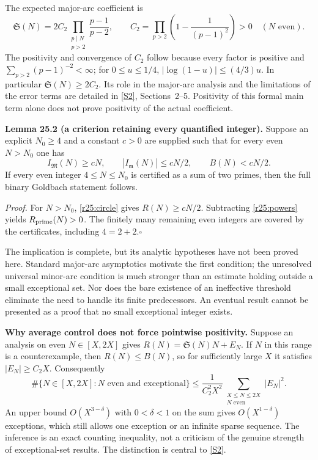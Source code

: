 \documentclass[11pt,a4paper]{article}
\newcommand{\N}{\mathbb{N}}
\newcommand{\sref}[2]{\hyperlink{source:#1:#2}{[S#2]}}
\numberwithin{equation}{section}
\begin{document}
The expected major-arc coefficient is
\begin{equation}\label{r25:singular}
 \mathfrak S(N)=2C_2\prod_{\substack{p\mid N\\p>2}}\frac{p-1}{p-2},
 \qquad C_2=\prod_{p>2}\left(1-\frac1{(p-1)^2}\right)>0
 \quad(N\text{ even}).
\end{equation}
The positivity and convergence of $C_2$ follow because every factor is
positive and $\sum_{p>2}(p-1)^{-2}<\infty$; for $0\le u\le1/4$,
$|\log(1-u)|\le(4/3)u$. In particular $\mathfrak S(N)\ge2C_2$.
Its role in the major-arc analysis and the limitations of the error terms
are detailed in \sref{25}{2}, Sections~2--5. Positivity of this formal
main term alone does not prove positivity of the actual coefficient.

\textbf{Lemma 25.2 (a criterion retaining every quantified integer).}
Suppose an explicit $N_0\ge4$ and a constant $c>0$ are supplied such that
for every even $N>N_0$ one has
\begin{equation}\label{r25:missing}
 I_{\mathfrak M}(N)\ge cN,\qquad
 |I_{\mathfrak m}(N)|\le cN/2,\qquad B(N)<cN/2.
\end{equation}
If every even integer $4\le N\le N_0$ is certified as a sum of two
primes, then the full binary Goldbach statement follows.

\emph{Proof.} For $N>N_0$, \eqref{r25:circle} gives $R(N)\ge cN/2$.
Subtracting \eqref{r25:powers} yields $R_{\rm prime}(N)>0$. The finitely
many remaining even integers are covered by the certificates, including
$4=2+2$.\hfill$\square$

The implication is complete, but its analytic hypotheses have not been
proved here. Standard major-arc asymptotics motivate the first condition;
the unresolved universal minor-arc condition is much stronger than an
estimate holding outside a small exceptional set. Nor does the bare
existence of an ineffective threshold eliminate the need to handle its
finite predecessors. An eventual result cannot be presented as a proof
that no small exceptional integer exists.

\medskip
\textbf{Why average control does not force pointwise positivity.}
Suppose an analysis on even $N\in[X,2X]$ gives
$R(N)=\mathfrak S(N)N+E_N$. If $N$ in this range is a counterexample,
then $R(N)\le B(N)$, so for sufficiently large $X$ it satisfies
$|E_N|\ge C_2X$. Consequently
\begin{equation}\label{r25:exceptional}
 \#\{N\in[X,2X]:N\text{ even and exceptional}\}
 \le\frac1{C_2^2X^2}\sum_{\substack{X\le N\le2X\\N\text{ even}}}|E_N|^2.
\end{equation}
An upper bound $O(X^{3-\delta})$ with $0<\delta<1$ on the sum gives
$O(X^{1-\delta})$ exceptions, which still allows one exception or an
infinite sparse sequence. The inference is an exact counting inequality,
not a criticism of the genuine strength of exceptional-set results.
The distinction is central to \sref{25}{2}.
\end{document}
